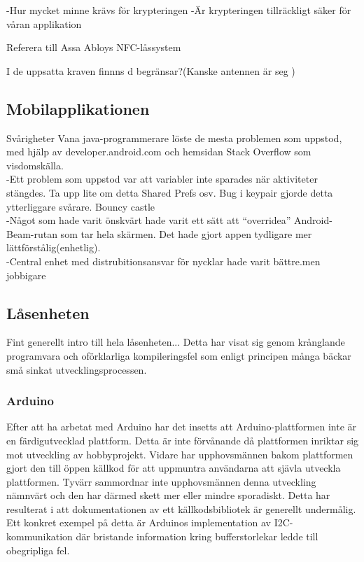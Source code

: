 \documentclass[11pt]{article}
\begin{document}
-Hur mycket minne krävs för krypteringen
-Är krypteringen tillräckligt säker för våran applikation

Referera till Assa Abloys NFC-låssystem

I de uppsatta kraven finnns
d begränsar?(Kanske antennen är seg )

\subsection{Mobilapplikationen}
Svårigheter
Vana java-programmerare löste de mesta problemen som uppstod, med hjälp av developer.android.com och hemsidan Stack Overflow som visdomskälla.\\
-Ett problem som uppstod var att variabler inte sparades när aktiviteter stängdes. Ta upp lite om detta
Shared Prefs osv. Bug i keypair gjorde detta ytterliggare svårare. Bouncy castle\\
-Något som hade varit önskvärt hade varit ett sätt att “overridea” Android-Beam-rutan som tar hela skärmen. Det hade gjort appen tydligare mer lättförstålig(enhetlig).\\
-Central enhet med distrubitionsansvar för nycklar hade varit bättre.men jobbigare

\subsection{Låsenheten}
Fint generellt intro till hela låsenheten...
Detta har visat sig genom krånglande programvara och oförklarliga kompileringsfel som enligt principen många bäckar små sinkat utvecklingsprocessen.

\subsubsection{Arduino}
Efter att ha arbetat med Arduino har det insetts att Arduino-plattformen inte är en färdigutvecklad plattform. Detta är inte förvånande då plattformen inriktar sig mot utveckling av hobbyprojekt. Vidare har upphovsmännen bakom plattformen gjort den till öppen källkod för att uppmuntra användarna att sjävla utveckla plattformen. Tyvärr sammordnar inte upphovsmännen denna utveckling nämnvärt och den har därmed skett mer eller mindre sporadiskt. Detta har resulterat i att dokumentationen av ett källkodsbibliotek är generellt undermålig. Ett konkret exempel på detta är Arduinos implementation av I2C-kommunikation där bristande information kring bufferstorlekar ledde till obegripliga fel. 
\end{document}
